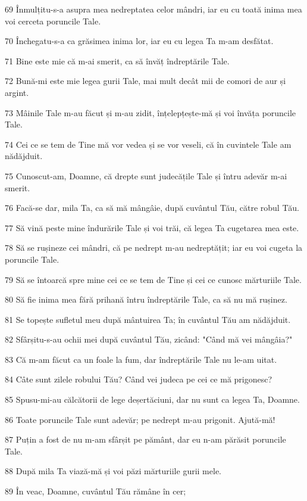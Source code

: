 \par 69 Înmulțitu-s-a asupra mea nedreptatea celor mândri, iar eu cu toată inima mea voi cerceta poruncile Tale.
\par 70 Închegatu-s-a ca grăsimea inima lor, iar eu cu legea Ta m-am desfătat.
\par 71 Bine este mie că m-ai smerit, ca să învăț îndreptările Tale.
\par 72 Bună-mi este mie legea gurii Tale, mai mult decât mii de comori de aur și argint.
\par 73 Mâinile Tale m-au făcut și m-au zidit, înțelepțește-mă și voi învăța poruncile Tale.
\par 74 Cei ce se tem de Tine mă vor vedea și se vor veseli, că în cuvintele Tale am nădăjduit.
\par 75 Cunoscut-am, Doamne, că drepte sunt judecățile Tale și întru adevăr m-ai smerit.
\par 76 Facă-se dar, mila Ta, ca să mă mângâie, după cuvântul Tău, către robul Tău.
\par 77 Să vină peste mine îndurările Tale și voi trăi, că legea Ta cugetarea mea este.
\par 78 Să se rușineze cei mândri, că pe nedrept m-au nedreptățit; iar eu voi cugeta la poruncile Tale.
\par 79 Să se întoarcă spre mine cei ce se tem de Tine și cei ce cunosc mărturiile Tale.
\par 80 Să fie inima mea fără prihană întru îndreptările Tale, ca să nu mă rușinez.
\par 81 Se topește sufletul meu după mântuirea Ta; în cuvântul Tău am nădăjduit.
\par 82 Sfârșitu-s-au ochii mei după cuvântul Tău, zicând: "Când mă vei mângâia?"
\par 83 Că m-am făcut ca un foale la fum, dar îndreptările Tale nu le-am uitat.
\par 84 Câte sunt zilele robului Tău? Când vei judeca pe cei ce mă prigonesc?
\par 85 Spusu-mi-au călcătorii de lege deșertăciuni, dar nu sunt ca legea Ta, Doamne.
\par 86 Toate poruncile Tale sunt adevăr; pe nedrept m-au prigonit. Ajută-mă!
\par 87 Puțin a fost de nu m-am sfârșit pe pământ, dar eu n-am părăsit poruncile Tale.
\par 88 După mila Ta viază-mă și voi păzi mărturiile gurii mele.
\par 89 În veac, Doamne, cuvântul Tău rămâne în cer;
